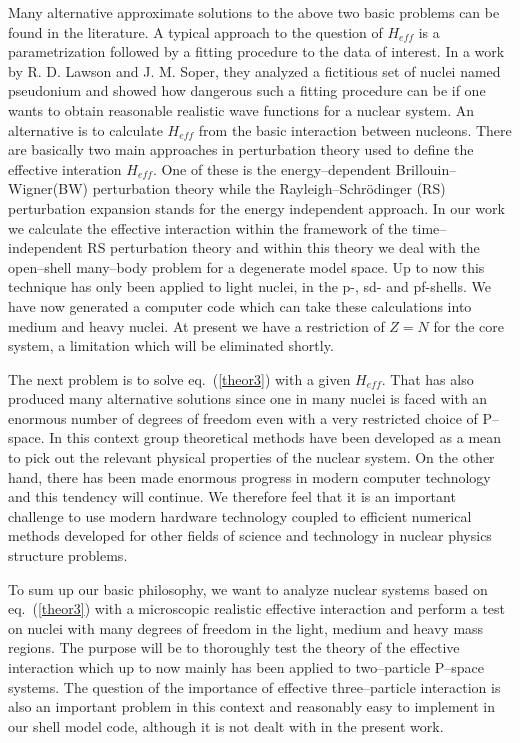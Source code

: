 Many alternative
approximate solutions to the above two basic problems
can be found in the
literature\cite{vall89}. A typical approach to the question of
$H_{eff}$ is a parametrization followed by a
fitting procedure to the data of interest. In a  work by
R. D. Lawson and J. M. Soper\cite{law65}, they analyzed
a fictitious set of nuclei named pseudonium
and showed how dangerous such a fitting procedure can be
if one wants to obtain  reasonable realistic wave functions
for a nuclear system. An alternative is to calculate
$H_{eff}$ from the basic interaction between nucleons.
There are basically two main approaches in perturbation theory
used to define the effective interation  $H_{eff}$.
One of these is the energy--dependent Brillouin--Wigner(BW)
perturbation theory while the Rayleigh--Schr\"{o}dinger (RS)
perturbation expansion stands for the energy independent approach.
In our work we calculate the effective interaction within the framework
of the time--independent RS perturbation theory and within this
theory we deal with the open--shell many--body problem for a
degenerate model space. Up to now this technique has only
been applied to light nuclei, in the p-, sd- and pf-shells.
We have now generated a computer code which can take these
calculations into medium and heavy nuclei.  At present we have
a restriction of $Z = N$ for the core system, a limitation
which will be eliminated shortly.

The next problem is to solve  eq.~(\ref{theor3}) with a
given $H_{eff}$. That has also produced many
alternative solutions since one  in many nuclei is faced
with an enormous number of degrees of freedom even with a very restricted
choice of P--space. In this context group theoretical methods have been
developed as a mean to pick out the relevant physical
properties of the nuclear system.
On the other hand, there has been made enormous
progress in modern computer technology and this tendency will continue.
We therefore feel that it is an important challenge
to use modern hardware technology coupled to efficient
numerical methods developed for  other fields of science
and technology in nuclear physics structure problems.

To sum up our basic philosophy,
we want to analyze nuclear systems based on eq.~(\ref{theor3})
with a microscopic realistic effective interaction
and perform a  test
on nuclei with many degrees of freedom in the light, medium
and heavy mass regions. The purpose will be to thoroughly test
the theory of the effective interaction which up to now mainly
has been applied to two--particle P--space systems.
The question of the importance of effective three--particle interaction
is also an important problem in this context and reasonably
easy to implement in our shell model code,
although it is not dealt with in the present work.

